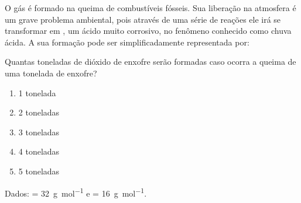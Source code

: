 \documentclass[10pt,a4paper]{article}
\begin{document}
\begin{prob}
	O gás  é formado na queima de combustíveis fósseis.
Sua liberação na atmosfera é um grave problema ambiental, pois através de uma série de reações ele irá se transformar em , um ácido muito corrosivo, no fenômeno conhecido como chuva ácida.
A sua formação pode ser simplificadamente representada por:

\begin{Scheme}
\end{Scheme}

Quantas toneladas de dióxido de enxofre serão formadas caso ocorra a queima
de uma tonelada de enxofre? 

\begin{enumerate}[label = (\scalealph{\alph*})]
	\item 1 tonelada		
	\item 2 toneladas
	\item 3 toneladas	
	\item 4 toneladas		
	\item 5 toneladas
\end{enumerate}

Dados:  = \SI{32}{\gram\per\mol} e  = \SI{16}{\gram\per\mol}.
\end{prob}

\begin{center}
\end{center}
\end{document}
